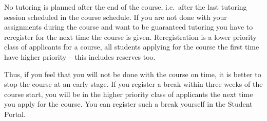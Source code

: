 No tutoring is planned after the end of the course, i.e.~after the last 
tutoring session scheduled in the course schedule.
If you are not done with your assignments during the course and want to be 
guaranteed tutoring you have to reregister for the next time the course is 
given.
Reregistration is a lower priority class of applicants for a course, all 
students applying for the course the first time have higher priority -- this 
includes reserves too.


Thus, if you feel that you will not be done with the course on time, it is 
better to stop the course at an early stage.
If you register a break within three weeks of the course start, you will be in 
the higher priority class of applicants the next time you apply for the course.
You can register such a break yourself in the Student Portal.


\printbibliography{}

